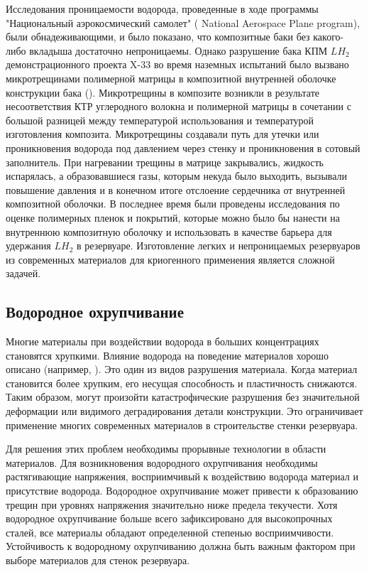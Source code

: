 Исследования проницаемости водорода, проведенные в ходе программы "Национальный аэрокосмический самолет" ( National Aerospace Plane program), были обнадеживающими, и было показано, что композитные баки без какого-либо вкладыша достаточно непроницаемы. Однако разрушение бака КПМ \(LH_2\) демонстрационного проекта X-33 во время наземных испытаний было вызвано микротрещинами полимерной матрицы в композитной внутренней оболочке конструкции бака (\cite{grimsley2001}). Микротрещины в композите возникли в результате несоответствия КТР углеродного волокна и полимерной матрицы в сочетании с большой разницей между температурой использования и температурой изготовления композита. Микротрещины создавали путь для утечки или проникновения водорода под давлением через стенку и проникновения в сотовый заполнитель. При нагревании трещины в матрице закрывались, жидкость испарялась, а образовавшиеся газы, которым некуда было выходить, вызывали повышение давления и в конечном итоге отслоение сердечника от внутренней композитной оболочки.  В последнее время были проведены исследования по оценке полимерных пленок и покрытий, которые можно было бы нанести на внутреннюю композитную оболочку и использовать в качестве барьера для удержания \(LH_2\) в резервуаре. Изготовление легких и непроницаемых резервуаров из современных материалов для криогенного применения является сложной задачей.

\subsection{Водородное охрупчивание}\label{ch:overview:1:sec2:sub4}

Многие материалы при воздействии водорода в больших концентрациях становятся хрупкими. Влияние водорода на поведение материалов хорошо описано (например, \cite{moodythompson1990}). Это один из видов разрушения материала. Когда материал становится более хрупким, его несущая способность и пластичность снижаются. Таким образом, могут произойти катастрофические разрушения без значительной деформации или видимого деградирования детали конструкции. Это ограничивает применение многих современных материалов в строительстве стенки резервуара.

Для решения этих проблем необходимы прорывные технологии в области материалов. Для возникновения водородного охрупчивания необходимы растягивающие напряжения, восприимчивый к воздействию водорода материал и присутствие водорода. Водородное охрупчивание может привести к образованию трещин при уровнях напряжения значительно ниже предела текучести. Хотя водородное охрупчивание больше всего зафиксировано для высокопрочных сталей, все материалы обладают определенной степенью восприимчивости. Устойчивость к водородному охрупчиванию должна быть важным фактором при выборе материалов для стенок резервуара.

